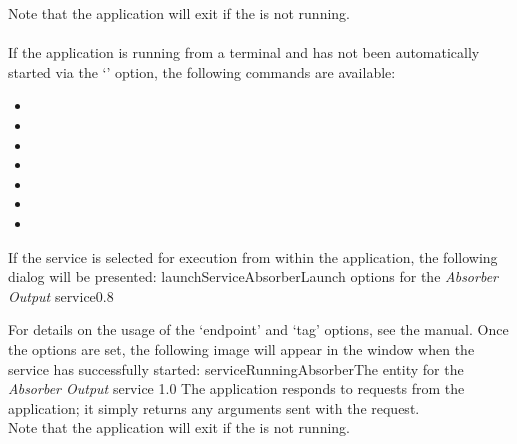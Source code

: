 Note that the application will exit if the  is not
running.\\

\insertAppParameters
{}
\insertOutputServiceComment\\

If the application is running from a terminal and has not been automatically started via
the `' option, the following commands are available:
\begin{itemize}
\item{}
\item\exSp{}
\item\exSp{}
\item\exSp{}
\item\exSp{}
\item\exSp{}
\item\exSp{}
\end{itemize}
\condPage
If the service is selected for execution from within the \emph{\CMU}
application, the following dialog will be presented:
%
{launchServiceAbsorber}{Launch options for the \emph{Absorber Output} service}{0.8}

For details on the usage of the `endpoint' and `tag' options, see the \emph{\CMU} manual.
Once the options are set, the following image will appear in the \emph{\CMU} window when
the service has successfully started:
%
{serviceRunningAbsorber}{The \emph{\CMU} entity for the \emph{Absorber Output} service}%
{1.0}
\condPage
{}
The  application responds to
 requests from the
 application; it simply returns any arguments
sent with the request.\\

Note that the application will exit if the  is not
running.\\


